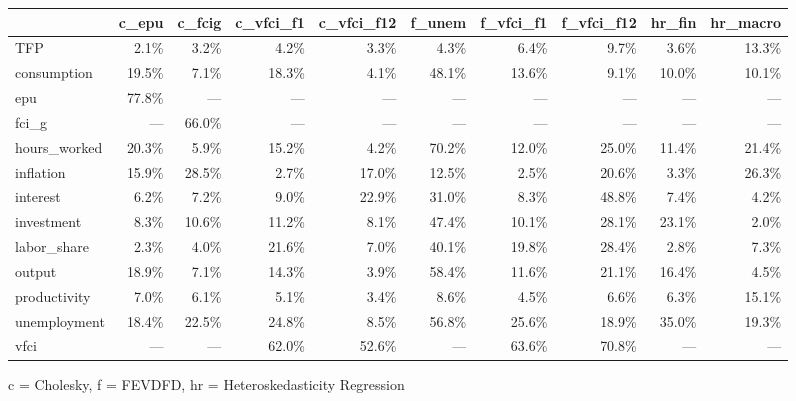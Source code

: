 
\fontsize{12.0pt}{14.4pt}\selectfont
\begin{tabular*}{\linewidth}{@{\extracolsep{\fill}}l|rrrrrrrrr}
\toprule
 & c\_epu & c\_fcig & c\_vfci\_f1 & c\_vfci\_f12 & f\_unem & f\_vfci\_f1 & f\_vfci\_f12 & hr\_fin & hr\_macro \\ 
\midrule\addlinespace[2.5pt]
TFP & 2.1\% & 3.2\% & 4.2\% & 3.3\% & 4.3\% & 6.4\% & 9.7\% & 3.6\% & 13.3\% \\ 
consumption & 19.5\% & 7.1\% & 18.3\% & 4.1\% & 48.1\% & 13.6\% & 9.1\% & 10.0\% & 10.1\% \\ 
epu & 77.8\% & — & — & — & — & — & — & — & — \\ 
fci\_g & — & 66.0\% & — & — & — & — & — & — & — \\ 
hours\_worked & 20.3\% & 5.9\% & 15.2\% & 4.2\% & 70.2\% & 12.0\% & 25.0\% & 11.4\% & 21.4\% \\ 
inflation & 15.9\% & 28.5\% & 2.7\% & 17.0\% & 12.5\% & 2.5\% & 20.6\% & 3.3\% & 26.3\% \\ 
interest & 6.2\% & 7.2\% & 9.0\% & 22.9\% & 31.0\% & 8.3\% & 48.8\% & 7.4\% & 4.2\% \\ 
investment & 8.3\% & 10.6\% & 11.2\% & 8.1\% & 47.4\% & 10.1\% & 28.1\% & 23.1\% & 2.0\% \\ 
labor\_share & 2.3\% & 4.0\% & 21.6\% & 7.0\% & 40.1\% & 19.8\% & 28.4\% & 2.8\% & 7.3\% \\ 
output & 18.9\% & 7.1\% & 14.3\% & 3.9\% & 58.4\% & 11.6\% & 21.1\% & 16.4\% & 4.5\% \\ 
productivity & 7.0\% & 6.1\% & 5.1\% & 3.4\% & 8.6\% & 4.5\% & 6.6\% & 6.3\% & 15.1\% \\ 
unemployment & 18.4\% & 22.5\% & 24.8\% & 8.5\% & 56.8\% & 25.6\% & 18.9\% & 35.0\% & 19.3\% \\ 
vfci & — & — & 62.0\% & 52.6\% & — & 63.6\% & 70.8\% & — & — \\ 
\bottomrule
\end{tabular*}
\begin{minipage}{\linewidth}
c = Cholesky, f = FEVDFD, hr = Heteroskedasticity Regression\\
\end{minipage}


